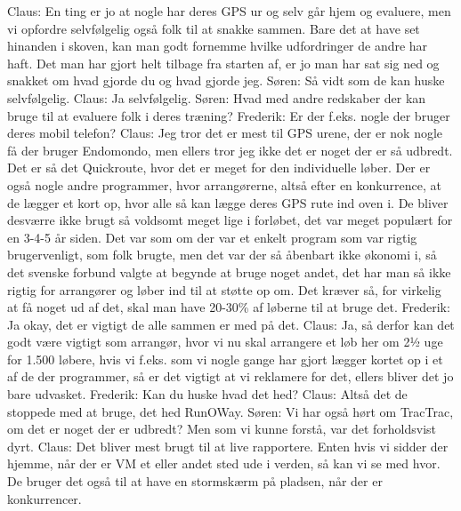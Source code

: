 Claus: En ting er jo at nogle har deres GPS ur og selv går hjem og evaluere, men vi opfordre selvfølgelig også folk til at snakke sammen. Bare det at have set hinanden i skoven, kan man godt fornemme hvilke udfordringer de andre har haft. Det man har gjort helt tilbage fra starten af, er jo man har sat sig ned og snakket om hvad gjorde du og hvad gjorde jeg. \newline
Søren: Så vidt som de kan huske selvfølgelig.\newline
Claus: Ja selvfølgelig. \newline
Søren: Hvad med andre redskaber der kan bruge til at evaluere folk i deres træning?\newline
Frederik: Er der f.eks. nogle der bruger deres mobil telefon?\newline
Claus: Jeg tror det er mest til GPS urene, der er nok nogle få der bruger Endomondo, men ellers tror jeg ikke det er noget der er så udbredt. Det er så det Quickroute, hvor det er meget for den individuelle løber. Der er også nogle andre programmer, hvor arrangørerne, altså efter en konkurrence, at de lægger et kort op, hvor alle så kan lægge deres GPS rute ind oven i. De bliver desværre ikke brugt så voldsomt meget lige i forløbet, det var meget populært for en 3-4-5 år siden. Det var som om der var et enkelt program som var rigtig brugervenligt, som folk brugte, men det var der så åbenbart ikke økonomi i, så det svenske forbund valgte at begynde at bruge noget andet, det har man så ikke rigtig for arrangører og løber ind til at støtte op om. Det kræver så, for virkelig at få noget ud af det, skal man have 20-30\% af løberne til at bruge det. \newline
Frederik: Ja okay, det er vigtigt de alle sammen er med på det. 
Claus: Ja, så derfor kan det godt være vigtigt som arrangør, hvor vi nu skal arrangere et løb her om 2½ uge for 1.500 løbere, hvis vi f.eks. som vi nogle gange har gjort lægger kortet op i et af de der programmer, så er det vigtigt at vi reklamere for det, ellers bliver det jo bare udvasket. \newline
Frederik: Kan du huske hvad det hed?\newline
Claus: Altså det de stoppede med at bruge, det hed RunOWay.\newline
Søren: Vi har også hørt om TracTrac, om det er noget der er udbredt? Men som vi kunne forstå, var det forholdsvist dyrt. \newline
Claus: Det bliver mest brugt til at live rapportere. Enten hvis vi sidder der hjemme, når der er VM et eller andet sted ude i verden, så kan vi se med hvor. De bruger det også til at have en stormskærm på pladsen, når der er konkurrencer. \newline
